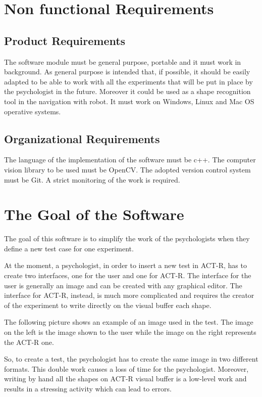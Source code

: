 	\section{Non functional Requirements}

		\subsection{Product Requirements}
		The software module must be general purpose, portable and it must work in background.
		As general purpose is intended that, if possible, it should be easily adapted to be able to work with all the experiments that will be put in place by the psychologist in the future. Moreover it could be used as a shape recognition tool in the navigation with robot. %
		It must work on Windows, Linux and Mac OS operative systems.
	
		\subsection{Organizational Requirements}
		The language of the implementation of the software must be c++. 
		The computer vision library to be used must be OpenCV.
		The adopted version control system must be Git.
		A strict monitoring of the work is required.



	\section{The Goal of the Software}
	The goal of this software is to simplify the work of the psychologists when they define a new test case for one experiment. 

	At the moment, a psychologist, in order to insert a new test in ACT-R, has to create two interfaces, one for the user and one for ACT-R.
	The interface for the user is generally an image and can be created with any graphical editor. 
	The interface for ACT-R, instead, is much more complicated and requires the creator of the experiment to write directly on the visual buffer each shape. 
	
	The following picture shows an example of an image used in the test.
	The image on the left is the image shown to the user while the image on the right represents the ACT-R one. 


	So, to create a test, the psychologist has to create the same image in two different formats.
	This double work causes a loss of time for the psychologist. Moreover, writing by hand all the shapes on ACT-R visual buffer is a low-level work and results in a stressing activity which can lead to errors.


